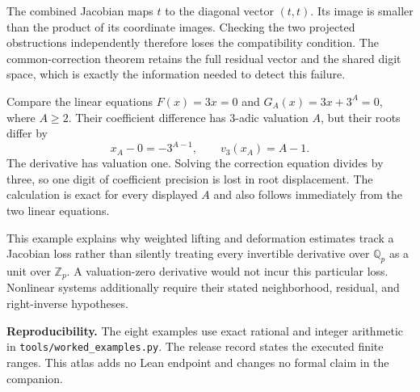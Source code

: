 The combined Jacobian maps $t$ to the diagonal vector $(t,t)$. Its image is smaller than the product of its coordinate images. Checking the two projected obstructions independently therefore loses the compatibility condition. The common-correction theorem retains the full residual vector and the shared digit space, which is exactly the information needed to detect this failure.

Compare the linear equations $F(x)=3x=0$ and $G_A(x)=3x+3^A=0$, where $A\ge2$. Their coefficient difference has $3$-adic valuation $A$, but their roots differ by
\[
 x_A-0=-3^{A-1},\qquad v_3(x_A)=A-1.
\]
The derivative has valuation one. Solving the correction equation divides by three, so one digit of coefficient precision is lost in root displacement. The calculation is exact for every displayed $A$ and also follows immediately from the two linear equations.

This example explains why weighted lifting and deformation estimates track a Jacobian loss rather than silently treating every invertible derivative over $\mathbb Q_p$ as a unit over $\mathbb Z_p$. A valuation-zero derivative would not incur this particular loss. Nonlinear systems additionally require their stated neighborhood, residual, and right-inverse hypotheses.

\medskip\noindent\textbf{Reproducibility.} The eight examples use exact rational and integer arithmetic in \nolinkurl{tools/worked_examples.py}. The release record states the executed finite ranges. This atlas adds no Lean endpoint and changes no formal claim in the companion.
\endgroup
